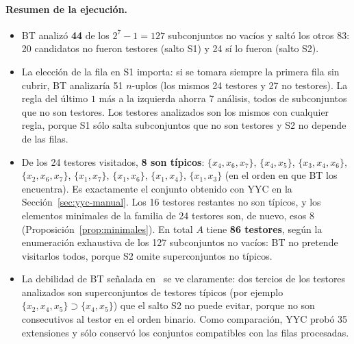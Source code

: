 \documentclass[11pt, a4paper]{article}
\theoremstyle{definition}
\theoremstyle{plain}
\newcommand{\x}[1]{x_{#1}}
\newcommand{\cj}[1]{\{#1\}}
\begin{document}
\begin{table}[p]
\centering
\small
\setlength{\tabcolsep}{4pt}
\renewcommand{\arraystretch}{0.9}

\caption{Recorrido completo de BT sobre $A$. En los no testores se listan las
filas sin cubrir y en negrita la elegida (la de último 1 más a la izquierda).
``S1: $x_k$'' indica el salto por fila de ceros (1 en $x_k$ y ceros a su
derecha); ``S2: $x_k$'', el salto por testor (sumar 1 en la posición $x_k$). En
los testores típicos se indica una fila típica de cada rasgo.}\label{tab:bttraza}
\end{table}

\paragraph{Resumen de la ejecución.}\label{sec:bt-resumen}
\begin{itemize}[nosep]
\item BT analizó \textbf{44} de los $2^7-1=127$ subconjuntos no vacíos y saltó los
  otros 83: 20 candidatos no fueron testores (salto S1) y 24 sí lo fueron (salto S2).
\item La elección de la fila en S1 importa: si se tomara siempre la primera fila
  sin cubrir, BT analizaría 51 $n$-uplos (los mismos 24 testores y 27 no testores).
  La regla del último $1$ más a la izquierda ahorra 7 análisis, todos de
  subconjuntos que no son testores. Los testores analizados son los mismos con
  cualquier regla, porque S1 sólo salta subconjuntos que no son testores y S2 no
  depende de las filas.
\item De los 24 testores visitados, \textbf{8 son típicos}:
  $\cj{\x4,\x6,\x7}$, $\cj{\x4,\x5}$, $\cj{\x3,\x4,\x6}$, $\cj{\x2,\x6,\x7}$,
  $\cj{\x1,\x7}$, $\cj{\x1,\x6}$, $\cj{\x1,\x4}$, $\cj{\x1,\x3}$ (en el orden en que
  BT los encuentra). Es exactamente el conjunto obtenido con YYC en la
  Sección~\ref{sec:yyc-manual}. Los 16 testores restantes no son típicos, y los elementos
  minimales de la familia de 24 testores son, de nuevo, esos 8
  (Proposición~\ref{prop:minimales}). En total $A$ tiene \textbf{86 testores},
  según la enumeración exhaustiva de los 127 subconjuntos no vacíos: BT no
  pretende visitarlos todos, porque S2 omite superconjuntos no típicos.
\item La debilidad de BT señalada en~\cite{pons2004} se ve claramente: dos tercios
  de los testores analizados son superconjuntos de testores típicos
  (por ejemplo $\cj{\x2,\x4,\x5}\supset\cj{\x4,\x5}$) que el salto S2 no puede
  evitar, porque no son consecutivos al testor en el orden binario. Como comparación,
  YYC probó 35 extensiones y sólo conservó los conjuntos compatibles con las filas procesadas.
\end{itemize}
\end{document}
